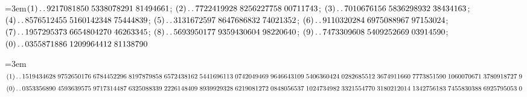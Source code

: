 \par\noindent\hangindent=3em\enspace $(1)\mathinner{.\,.}9217081850\;\allowbreak 5338078291\;\allowbreak 81494661$; $(2)\mathinner{.\,.}7722419928\;\allowbreak 8256227758\;\allowbreak 00711743$; $(3)\mathinner{.\,.}7010676156\;\allowbreak 5836298932\;\allowbreak 38434163$; $(4)\mathinner{.\,.}8576512455\;\allowbreak 5160142348\;\allowbreak 75444839$; $(5)\mathinner{.\,.}3131672597\;\allowbreak 8647686832\;\allowbreak 74021352$; $(6)\mathinner{.\,.}9110320284\;\allowbreak 6975088967\;\allowbreak 97153024$; $(7)\mathinner{.\,.}1957295373\;\allowbreak 6654804270\;\allowbreak 46263345$; $(8)\mathinner{.\,.}5693950177\;\allowbreak 9359430604\;\allowbreak 98220640$; $(9)\mathinner{.\,.}7473309608\;\allowbreak 5409252669\;\allowbreak 03914590$; $(0)\mathinner{.\,.}0355871886\;\allowbreak 1209964412\;\allowbreak 81138790$\par\smallskip

\par\noindent\hangindent=3em\enspace $(1)\mathinner{.\,.}1519434628\;\allowbreak 9752650176\;\allowbreak 6784452296\;\allowbreak 8197879858\;\allowbreak 6572438162\;\allowbreak 5441696113\;\allowbreak 0742049469\;\allowbreak 9646643109\;\allowbreak 5406360424\;\allowbreak 0282685512\;\allowbreak 3674911660\;\allowbreak 7773851590\;\allowbreak 1060070671\;\allowbreak 3780918727\;\allowbreak 9$ $(0)\mathinner{.\,.}0353356890\;\allowbreak 4593639575\;\allowbreak 9717314487\;\allowbreak 6325088339\;\allowbreak 2226148409\;\allowbreak 8939929328\;\allowbreak 6219081272\;\allowbreak 0848056537\;\allowbreak 1024734982\;\allowbreak 3321554770\;\allowbreak 3180212014\;\allowbreak 1342756183\;\allowbreak 7455830388\;\allowbreak 6925795053\;\allowbreak 0$\par\smallskip

\par\endgroup
